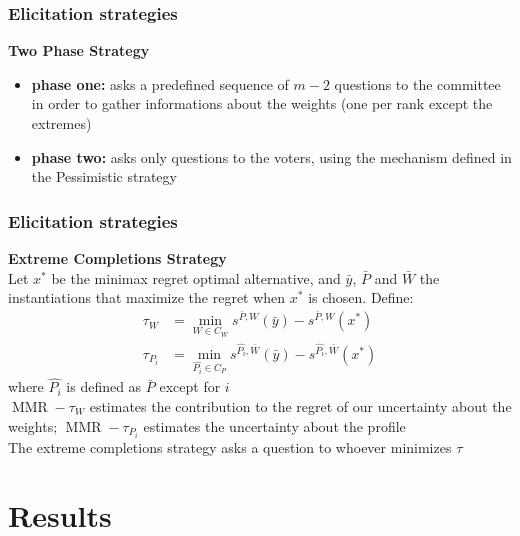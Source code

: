 \documentclass{beamer}
\DeclareMathOperator{\MMR}{MMR}
\begin{document}
	\begin{frame}[t]
		\frametitle{Elicitation strategies}
		\textbf{Two Phase Strategy} \\
		\bigskip
		\begin{itemize}
			\item <2-> \textbf{phase one:} asks a predefined sequence of $m - 2$ questions to the committee in order to gather informations about the weights (one per rank except the extremes)
			\item <3-> \textbf{phase two:} asks only questions to the voters, using the mechanism defined in the Pessimistic strategy
		\end{itemize}
	\end{frame}
	
	\begin{frame}[t]
		\frametitle{Elicitation strategies}
		\textbf{Extreme Completions Strategy} \\
		\medskip
		\onslide<2-> Let $x^{*}$ be the minimax regret optimal alternative, and $\bar{y}$, $\bar{P}$ and $\bar{W}$ the instantiations that maximize the regret when $x^*$ is chosen. \onslide<3-> Define: 
		\begin{align*}
		\tau_{W} & = \min_{W \in C_W} s^{\bar{P},W}(\bar{y}) - s^{\bar{P},W}(x^{*}) \\
		\tau_{P_i} & = \min_{\hat{P_i} \in C_P} s^{\hat{P_i},\bar{W}}(\bar{y}) -  s^{\hat{P_i},\bar{W}}(x^{*})
		\end{align*}
		where $\hat{P_i}$ is defined as $\bar{P}$ except for $i$ \\
		\bigskip
		\onslide<4->
		$\MMR - \tau_{W}$ estimates the contribution to the regret of our uncertainty about the weights; $\MMR - \tau_{P_i}$ estimates the uncertainty about the profile
		\\ \bigskip
		\onslide<5-> The extreme completions strategy asks a question to whoever minimizes $\tau$
	\end{frame}
	
	\section{Results}
\end{document}
